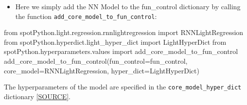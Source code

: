 \documentclass[
  letterpaper,
  DIV=11,
  numbers=noendperiod]{scrreprt}
\newenvironment{Shaded}{\begin{snugshade}}{\end{snugshade}}
\newcommand{\ImportTok}[1]{\textcolor[rgb]{0.00,0.46,0.62}{#1}}
\newcommand{\NormalTok}[1]{\textcolor[rgb]{0.00,0.23,0.31}{#1}}
\newcommand{\OperatorTok}[1]{\textcolor[rgb]{0.37,0.37,0.37}{#1}}
\providecommand{\tightlist}{%
  \setlength{\itemsep}{0pt}\setlength{\parskip}{0pt}}\usepackage{longtable,booktabs,array}
\begin{document}
\begin{itemize}
\tightlist
\item
  Here we simply add the NN Model to the fun\_control dictionary by
  calling the function \texttt{add\_core\_model\_to\_fun\_control}:
\end{itemize}

\begin{Shaded}
\begin{Highlighting}[]
\ImportTok{from}\NormalTok{ spotPython.light.regression.rnnlightregression }\ImportTok{import}\NormalTok{ RNNLightRegression}
\ImportTok{from}\NormalTok{ spotPython.hyperdict.light\_hyper\_dict }\ImportTok{import}\NormalTok{ LightHyperDict}
\ImportTok{from}\NormalTok{ spotPython.hyperparameters.values }\ImportTok{import}\NormalTok{ add\_core\_model\_to\_fun\_control}
\NormalTok{add\_core\_model\_to\_fun\_control(fun\_control}\OperatorTok{=}\NormalTok{fun\_control,}
\NormalTok{                              core\_model}\OperatorTok{=}\NormalTok{RNNLightRegression,}
\NormalTok{                              hyper\_dict}\OperatorTok{=}\NormalTok{LightHyperDict)}
\end{Highlighting}
\end{Shaded}

The hyperparameters of the model are specified in the
\texttt{core\_model\_hyper\_dict} dictionary
\href{https://github.com/sequential-parameter-optimization/spotPython/blob/main/src/spotPython/hyperdict/light_hyper_dict.json}{{[}SOURCE{]}}.
\end{document}
